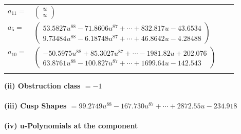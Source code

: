 \documentclass[1p]{elsarticle_modified}
\theoremstyle{definition}
\begin{document}
\begin{tabular}{m{7pt} m{180pt} m{7pt} m{180pt} }
\flushright $a_{11}=$&$\begin{pmatrix}u\\u\end{pmatrix}$ \\
\flushright $a_{5}=$&$\begin{pmatrix}53.5827 u^{88}-71.8606 u^{87}+\cdots+832.817 u-43.6534\\9.73484 u^{88}-6.18748 u^{87}+\cdots+46.8642 u-4.28488\end{pmatrix}$ \\
\flushright $a_{10}=$&$\begin{pmatrix}-50.5975 u^{88}+85.3027 u^{87}+\cdots-1981.82 u+202.076\\63.8761 u^{88}-100.827 u^{87}+\cdots+1699.64 u-142.543\end{pmatrix}$\\&\end{tabular}
\flushleft \textbf{(ii) Obstruction class $= -1$}\\~\\
\flushleft \textbf{(iii) Cusp Shapes $= 99.2749 u^{88}-167.730 u^{87}+\cdots+2872.55 u-234.918$}\\~\\
\newpage\renewcommand{\arraystretch}{1}
\flushleft \textbf{(iv) u-Polynomials at the component}\newline \\
\end{document}
